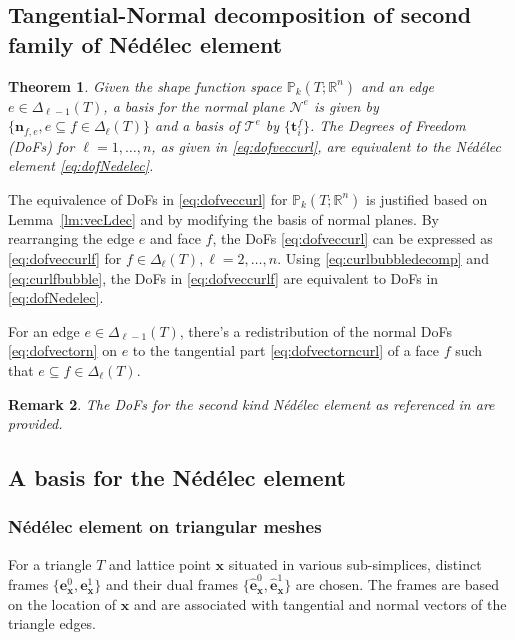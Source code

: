 \documentclass[12pt, a4paper]{article}
\newcommand{\bs}{\boldsymbol}
\newtheorem{theorem}{Theorem}
\newtheorem{remark}[theorem]{Remark}
\begin{document}
\subsection{Tangential-Normal decomposition of second family of N\'ed\'elec element}

\begin{theorem}
Given the shape function space $\mathbb P_k(T;\mathbb R^n)$ and an edge $e\in \Delta_{\ell-1}(T)$, a basis for the normal plane $\mathscr N^e$ is given by $\{\bs n_{f,e}, e\subseteq f\in\Delta_{\ell}(T)\}$ and a basis of $\mathscr T^e$ by $\{\bs t_i^f\}$. The Degrees of Freedom (DoFs) for $\ell = 1,\ldots, n$, as given in \eqref{eq:dofveccurl}, are equivalent to the N\'ed\'elec element \eqref{eq:dofNedelec}.
\end{theorem}

The equivalence of DoFs in \eqref{eq:dofveccurl} for $\mathbb P_k(T;\mathbb R^n)$ is justified based on Lemma~\ref{lm:vecLdec} and by modifying the basis of normal planes. By rearranging the edge $e$ and face $f$, the DoFs \eqref{eq:dofveccurl} can be expressed as \eqref{eq:dofveccurlf} for $f\in \Delta_{\ell}(T), \ell = 2,\ldots, n$. Using \eqref{eq:curlbubbledecomp} and \eqref{eq:curlfbubble}, the DoFs in \eqref{eq:dofveccurlf} are equivalent to DoFs in \eqref{eq:dofNedelec}.

For an edge $e\in \Delta_{\ell-1}(T)$, there's a redistribution of the normal DoFs \eqref{eq:dofvectorn} on $e$ to the tangential part \eqref{eq:dofvectorncurl} of a face $f$ such that $e\subseteq f\in\Delta_{\ell}(T)$.

\begin{remark}
The DoFs for the second kind N\'ed\'elec element as referenced in \cite{Nedelec1986,ArnoldFalkWinther2006} are provided.
\end{remark}

\subsection{A basis for the N\'ed\'elec element}

\subsubsection{N\'ed\'elec element on triangular meshes}
For a triangle \( T \) and lattice point \( \boldsymbol{x} \) situated in various sub-simplices, distinct frames \( \{\bs e_{\boldsymbol x}^0, \bs e_{\bs x}^1\} \) and their dual frames \( \{\hat {\bs e}_{\bs x}^0, \hat{\bs e}_{\bs x}^1\} \) are chosen. The frames are based on the location of \( \boldsymbol{x} \) and are associated with tangential and normal vectors of the triangle edges.
\end{document}
